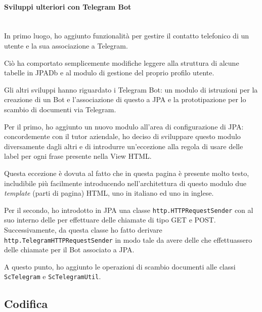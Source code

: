 \paragraph{Sviluppi ulteriori con Telegram Bot} \mbox{} \\

In primo luogo, ho aggiunto funzionalità per gestire il contatto telefonico di
un utente e la sua associazione a Telegram.

Ciò ha comportato semplicemente modifiche leggere alla struttura di alcune
tabelle in JPADb e al modulo di gestione del proprio profilo utente.

Gli altri sviluppi hanno riguardato i Telegram Bot: un modulo di istruzioni per
la creazione di un Bot e l'associazione di questo a JPA e la prototipazione
per lo scambio di documenti via Telegram.

Per il primo, ho aggiunto un nuovo modulo all'area di configurazione di
JPA: concordemente con il tutor aziendale, ho deciso di sviluppare questo
modulo diversamente dagli altri e di introdurre un'eccezione alla regola di
usare delle label per ogni frase presente nella View HTML.

Questa eccezione è dovuta al fatto che in questa pagina è presente molto testo,
includibile più facilmente introducendo nell'architettura di questo modulo due
\emph{template} (parti di pagina) HTML, uno in italiano ed uno in inglese.

Per il secondo, ho introdotto in JPA una classe
\texttt{http.HTTPRequestSender} con al suo interno delle  per
effettuare delle chiamate  di tipo GET e POST. Successivamente, da
questa classe ho fatto derivare \texttt{http.TelegramHTTPRequestSender} in modo
tale da avere delle  che effettuassero delle chiamate per il Bot
associato a JPA.

A questo punto, ho aggiunto le operazioni di scambio documenti alle classi
\texttt{ScTelegram} e \texttt{ScTelegramUtil}.


\subsection{Codifica}


